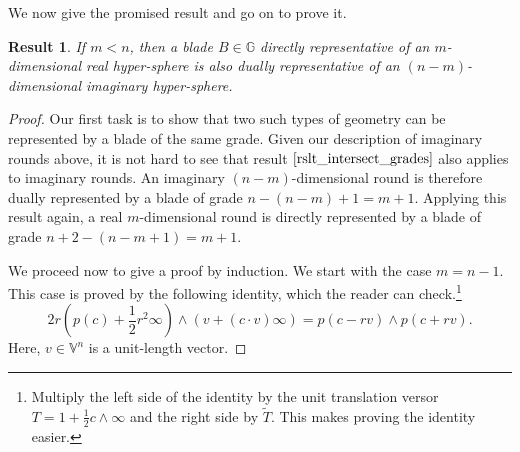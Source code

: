 \documentclass[12pt]{article}
\newcommand{\G}{\mathbb{G}}
\newcommand{\V}{\mathbb{V}}
\newcommand{\nvai}{\infty}
\newtheorem{result}{Result}[section]
\begin{document}
We now give the promised result and go on to prove it.
\begin{result}
If $m<n$, then a blade $B\in\G$ directly representative of an $m$-dimensional real hyper-sphere
is also dually representative of an $(n-m)$-dimensional imaginary hyper-sphere.
\end{result}
\begin{proof}
Our first task is to show that two such types of geometry can be represented by
a blade of the same grade.  Given our description of imaginary rounds above,
it is not hard to see that result $\eqref{rslt_intersect_grades}$ also applies to imaginary rounds.
An imaginary $(n-m)$-dimensional round is therefore dually represented by a blade
of grade $n-(n-m)+1=m+1$.  Applying this result again, a real $m$-dimensional round
is directly represented by a blade of grade $n+2-(n-m+1)=m+1$.

We proceed now to give a proof by induction.  We start with the case $m=n-1$.
This case is proved by the following identity, which the reader can check.\footnote{
Multiply the left side of the identity by the unit translation versor $T=1+\frac{1}{2}c\wedge\nvai$ and the right
side by $\tilde{T}$.  This makes proving the identity easier.}
\begin{equation*}
2r(p(c)+\frac{1}{2}r^2\nvai)\wedge(v+(c\cdot v)\nvai) = p(c-rv)\wedge p(c+rv).
\end{equation*}
Here, $v\in\V^n$ is a unit-length vector.


\end{proof}
\end{document}
